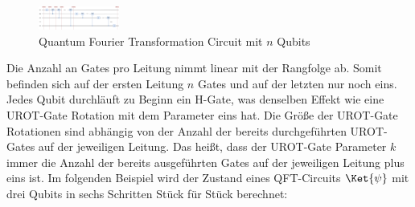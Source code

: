 \begin{figure}
    \centering
    \includegraphics[width=100]{content/qft-circuit.png}
    \caption{Quantum Fourier Transformation Circuit mit \(n\) Qubits}
    \label{fig:qftCircuit}
\end{figure}


Die Anzahl an Gates pro Leitung nimmt linear mit der Rangfolge ab. Somit befinden sich auf der ersten Leitung \(n\) Gates
und auf der letzten nur noch eins. \newline
Jedes Qubit durchläuft zu Beginn ein H-Gate, was denselben Effekt wie eine UROT-Gate Rotation mit dem Parameter eins hat.
Die Größe der UROT-Gate Rotationen sind abhängig von der Anzahl der bereits durchgeführten UROT-Gates auf der jeweiligen Leitung.
Das heißt, dass der UROT-Gate Parameter \(k\) immer die Anzahl der bereits ausgeführten Gates auf der jeweiligen Leitung plus eins ist.
\newline
Im folgenden Beispiel wird der Zustand eines QFT-Circuits \(\Ket{\psi}\) mit drei Qubits in sechs Schritten Stück für Stück berechnet:



